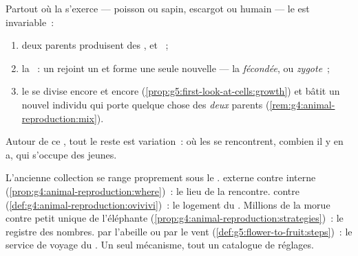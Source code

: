 \begin{proposition}\label{prop:g8:sexual-reproduction:core}
Partout où la  s'exerce --- poisson ou sapin,
escargot ou humain --- le  est invariable~:
\begin{enumerate}
  \item deux parents produisent des ,  et ~;
  \item la \emph{}~: un   rejoint un 
         et forme une seule  nouvelle --- la
        \emph{ fécondée}, ou
        \emph{zygote}~;
  \item le  se divise encore et encore
        (\cref{prop:g5:first-look-at-cells:growth}) et bâtit un
        nouvel individu qui porte quelque chose des \emph{deux}
        parents
        (\cref{rem:g4:animal-reproduction:mix}).
\end{enumerate}
Autour de ce , tout le reste est variation~: où les  se
rencontrent, combien il y en a, qui s'occupe des jeunes.
\end{proposition}
\admitted

\begin{example}\label{ex:g8:sexual-reproduction:variations}
L'ancienne collection se range proprement sous le . 
externe contre  interne
(\cref{prop:g4:animal-reproduction:where})~: le lieu de la
rencontre.  contre 
(\cref{def:g4:animal-reproduction:ovivivi})~: le logement du .
Millions de la morue contre petit unique de l'éléphante
(\cref{prop:g4:animal-reproduction:strategies})~: le registre des
nombres.  par l'abeille ou par le vent
(\cref{def:g5:flower-to-fruit:steps})~: le service de voyage du
 . Un seul mécanisme, tout un catalogue de réglages.
\end{example}

